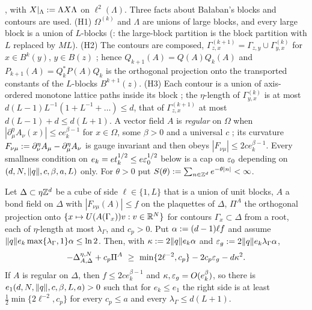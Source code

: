 \cite[(1.13)]{Ba4}, with $X|_\Lambda:=\Lambda X\Lambda$ on $\ell^2(\Lambda)$. Three facts about Ba{\l}aban's blocks and contours are used. (H1) $\Omega^{(k)}$ and $\Lambda$ are unions of large blocks, and every large block is a union of $L$-blocks (\cite[p.~607]{Ba1}: the large-block partition is the block partition with $L$ replaced by $ML$). (H2) The contours are composed, $\Gamma^{(k+1)}_{z,x}=\Gamma_{z,y}\cup\Gamma^{(k)}_{y,x}$ for $x\in B^k(y)$, $y\in B(z)$ \cite[(2.2)]{Ba1}; hence $Q_{k+1}(A)=Q(A)Q_k(A)$ and $P_{k+1}(A)=Q_k^*P(A)Q_k$ is the orthogonal projection onto the transported constants of the $L$-blocks $B^{k+1}(z)$. (H3) Each contour is a union of axis-ordered monotone lattice paths inside its block \cite[(2.1)]{Ba1}; the $\eta$-length of $\Gamma^{(k)}_{y,x}$ is at most $d(L-1)L^{-1}(1+L^{-1}+\dots)\le d$, that of $\Gamma^{(k+1)}_{z,x}$ at most $d(L-1)+d\le d(L+1)$. A vector field $A$ is \emph{regular} on $\Omega$ when $|\partial^\eta_\mu A_\nu(x)|\le ce_k^{\beta-1}$ for $x\in\Omega$, some $\beta>0$ and a universal $c$ \cite[(1.7)]{Ba4}; its curvature $F_{\nu\mu}:=\partial^\eta_\nu A_\mu-\partial^\eta_\mu A_\nu$ \cite[(1.6)]{Ba1} is gauge invariant and then obeys $|F_{\nu\mu}|\le2ce_k^{\beta-1}$. Every smallness condition on $e_k=et_k^{1/2}\le e\varepsilon_0^{1/2}$ below is a cap on $\varepsilon_0$ depending on $(d,N,\lVert q\rVert,c,\beta,a,L)$ only. For $\theta>0$ put $S(\theta):=\sum_{n\in\mathbb Z^d}e^{-\theta|n|}<\infty$.

\begin{lemma}\label{lem:a06A:cube}
Let $\Delta\subset\eta\mathbb Z^d$ be a cube of side $\ell\in\{1,L\}$ that is a union of unit blocks, $A$ a bond field on $\Delta$ with $|F_{\nu\mu}(A)|\le f$ on the plaquettes of $\Delta$, $\Pi^A$ the orthogonal projection onto $\{x\mapsto U(A(\Gamma_x))v:v\in\mathbb R^N\}$ for contours $\Gamma_x\subset\Delta$ from a root, each of $\eta$-length at most $\lambda_\Gamma$, and $c_p>0$. Put $\alpha:=(d-1)\ell f$ and assume $\lVert q\rVert e_k\max\{\lambda_\Gamma,1\}\alpha\le\ln2$. Then, with $\kappa:=2\lVert q\rVert e_k\alpha$ and $\varepsilon_g:=2\lVert q\rVert e_k\lambda_\Gamma\alpha$,
\[
-\Delta^{\eta,N}_{A,\Delta}+c_p\Pi^A\ \ge\ \min\{2\ell^{-2},c_p\}-2c_p\eps_g-d\kappa^2 .
\]
If $A$ is regular on $\Delta$, then $f\le2ce_k^{\beta-1}$ and $\kappa,\varepsilon_g=O(e_k^\beta)$, so there is $e_1(d,N,\lVert q\rVert,c,\beta,L,a)>0$ such that for $e_k\le e_1$ the right side is at least $\frac12\min\{2\ell^{-2},c_p\}$ for every $c_p\le a$ and every $\lambda_\Gamma\le d(L+1)$.
\end{lemma}


